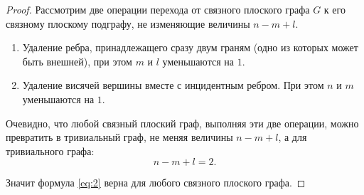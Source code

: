 \begin{proof}
    Рассмотрим две операции перехода от связного плоского графа $ G $ к его связному плоскому подграфу, не изменяющие величины $ n-m+l $.
    \begin{enumerate}
        \item Удаление ребра, принадлежащего сразу двум граням (одно из которых может быть внешней), при этом $ m $ и $ l $ уменьшаются на $ 1 $.
        \item Удаление висячей вершины вместе с инцидентным ребром. При этом $ n $ и $ m $ уменьшаются на $ 1 $.
    \end{enumerate}

    Очевидно, что любой связный плоский граф, выполняя эти две операции, можно превратить в тривиальный граф, не меняя величины $ n-m+l $, а для тривиального графа:
    \[
        n-m+l=2.
    \]

    Значит формула \ref{eq:2} верна для любого связного плоского графа.
\end{proof}